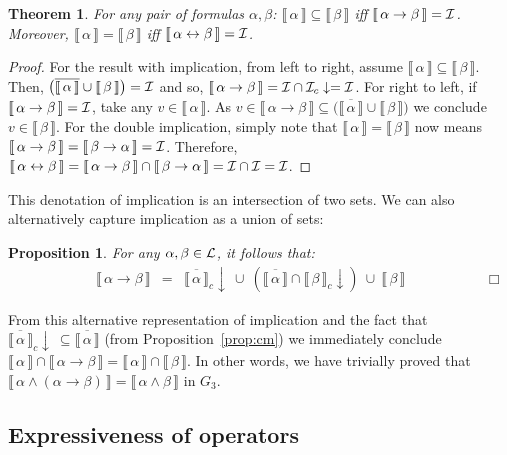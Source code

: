 \documentclass{tlp}
\def\cI{{\cal I}}
\def\down{\downarrow}
\def\L{{\cal L}}
\newcommand\non[1]{\overline{#1} }
\newcommand{\den}[1]{\llbracket \, #1 \, \rrbracket}
\newtheorem{theorem}{Theorem}
\newtheorem{proposition}{Proposition}
\begin{document}
\begin{theorem}
For any pair of formulas $\alpha, \beta$: $\den\alpha \subseteq \den\beta$ iff $\den{\alpha \rightarrow \beta} =\cI$. Moreover, $\den\alpha=\den\beta$ iff $\den{\alpha \leftrightarrow \beta} =\cI$.
\end{theorem}

\begin{proof}
For the result with implication, from left to right, assume $\den\alpha \subseteq \den\beta$. Then, $\big( \non{\den{\alpha}} \cup \den{\beta} \big) = \cI$ and so, $\den{\alpha \rightarrow \beta}=\cI \cap \cI_c\down=\cI$. For right to left, if $\den{\alpha \rightarrow \beta} =\cI$, take any $v \in \den\alpha$. As $v \in \den{\alpha \rightarrow \beta} \subseteq \big( \non{\den{\alpha}} \cup \den{\beta} \big)$ we conclude $v \in \den\beta$. For the double implication, simply note that $\den\alpha=\den\beta$ now means $\den{\alpha \rightarrow \beta}=\den{\beta \rightarrow \alpha}=\cI$. Therefore, $\den{\alpha \leftrightarrow \beta}=\den{\alpha \rightarrow \beta} \cap \den{\beta \rightarrow \alpha}=\cI\cap\cI=\cI$.
\end{proof}

\noindent This denotation of implication is an intersection of two sets. We can also alternatively capture implication as a union of sets:
\begin{proposition}\label{prop:vt2} 
For any $\alpha, \beta \in \L$, it follows that:
\begin{eqnarray*}
\hspace{68pt} \den{ \alpha \rightarrow \beta} & = & \overline{\den\alpha}_c \down \ \cup \ ( \overline{\den{\alpha}} \cap \den\beta_c \down) \ \cup \ \den\beta
\hspace{68pt}\Box 
\end{eqnarray*}
\end{proposition}

From this alternative representation of implication and the fact that $\non{\den{\alpha}}_c\down \ \subseteq \non{\den\alpha}$ (from Proposition~\ref{prop:cm}) we immediately conclude $\den\alpha \cap \den{\alpha \rightarrow \beta} = \den\alpha \cap \den\beta$. In other words, we have trivially proved that $\den{\alpha \wedge (\alpha \rightarrow \beta)}=\den{\alpha \wedge \beta}$ in $G_3$.

\subsection{Expressiveness of operators}
\end{document}
